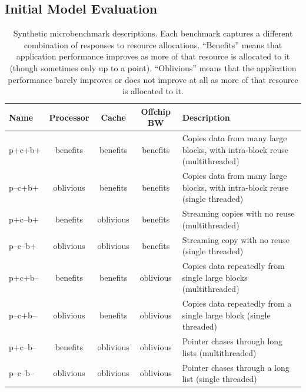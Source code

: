 \subsection{Initial Model Evaluation}
\label{init_eval}

\begin{table}[t]
\begin{tabular}{|l|c|c|c|l|}
\hline
 Name  & Processor  &  Cache &  Offchip BW & Description \\ \hline
 p+c+b+ & benefits & benefits & benefits &  Copies data from many large blocks, with intra-block reuse (multithreaded)\\ \hline
p--c+b+ & oblivious & benefits & benefits &  Copies data from many large blocks, with intra-block reuse (single threaded)\\ \hline
p+c--b+ & benefits & oblivious & benefits &  Streaming copies with no reuse (multithreaded)\\ \hline
p--c--b+ & oblivious & oblivious & benefits &  Streaming copy with no reuse (single threaded)\\ \hline
p+c+b-- & benefits & benefits & oblivious &  Copies data repeatedly from single large blocks (multithreaded)\\ \hline
p--c+b-- & oblivious & benefits & oblivious &  Copies data repeatedly from a single large block (single threaded)\\ \hline
p+c--b-- & benefits & oblivious & oblivious &  Pointer chases through long lists (multithreaded)\\ \hline
p--c--b-- & oblivious & oblivious & oblivious &  Pointer chases through a long list (single threaded)\\ \hline
\end{tabular}
\caption{Synthetic microbenchmark descriptions. Each benchmark captures a different combination of responses to resource allocations.  ``Benefits'' means that application performance improves as more of that resource is allocated to it (though sometimes only up to a point).  ``Oblivious'' means that the application performance barely improves or does not improve at all as more of that resource is allocated to it.}
\label{table:benchmarks1}
\end{table}

